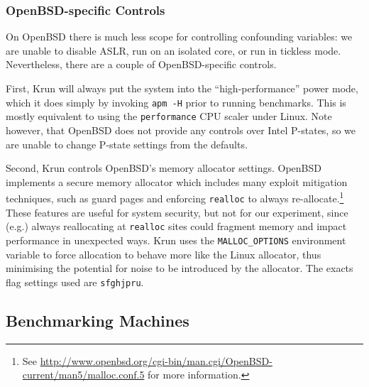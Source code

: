 \documentclass[10pt,preprint]{sigplanconf}
\newcommand{\krun}{Krun\xspace}
\begin{document}
\subsubsection{OpenBSD-specific Controls}

On OpenBSD there is much less scope for controlling confounding variables: we
are unable to disable ASLR, run on an isolated core, or run in tickless mode.
Nevertheless, there are a couple of OpenBSD-specific controls.

First, \krun will always put the system into the ``high-performance'' power
mode, which it does simply by invoking \texttt{apm -H} prior to running
benchmarks. This is mostly equivalent to using the \texttt{performance} CPU
scaler under Linux. Note however, that OpenBSD does not provide any controls
over Intel P-states, so we are unable to change P-state settings from the
defaults.

Second, \krun controls OpenBSD's memory allocator settings. OpenBSD implements
a secure memory allocator which includes many exploit mitigation techniques,
such as guard pages and enforcing \texttt{realloc} to always
re-allocate.\footnote{See
\url{http://www.openbsd.org/cgi-bin/man.cgi/OpenBSD-current/man5/malloc.conf.5}
for more information.} These features are useful for system security, but not
for our experiment, since (e.g.) always reallocating at
\texttt{realloc} sites could fragment memory and impact performance in
unexpected ways. \krun uses the
\texttt{MALLOC\_OPTIONS} environment variable to force allocation to behave
more like the Linux allocator, thus minimising the potential for noise to be
introduced by the allocator. The exacts flag settings used are
\texttt{sfghjpru}.

\subsection{Benchmarking Machines}
\end{document}
